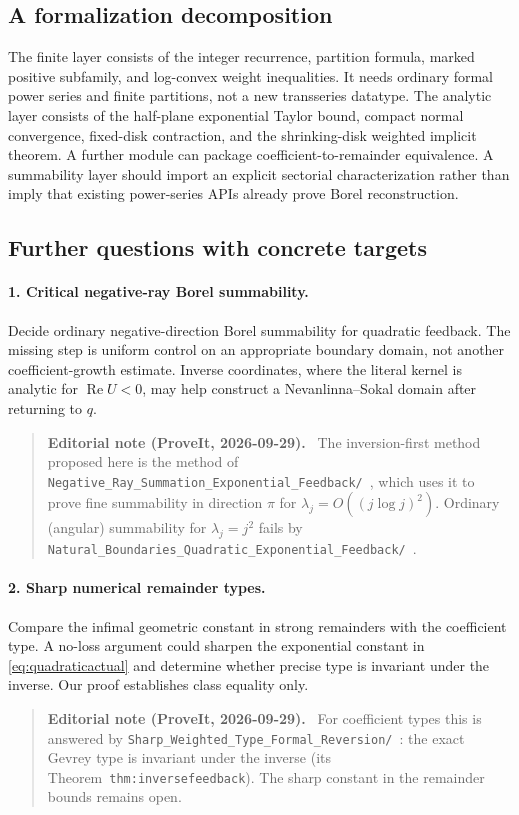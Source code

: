 \documentclass[11pt,a4paper]{article}
\numberwithin{equation}{section}
\theoremstyle{definition}\newtheorem{definition}[theorem]{Definition}
\theoremstyle{remark}\newtheorem{remark}[theorem]{Remark}
\DeclareMathOperator{\Rea}{Re}
\newenvironment{ednote}{\par\smallskip\begin{quote}\small\raggedright\textbf{Editorial note (ProveIt, 2026-09-29).}\ }{\end{quote}\smallskip}
\begin{document}
\subsection{A formalization decomposition}
The finite layer consists of the integer recurrence, partition formula,
marked positive subfamily, and log-convex weight inequalities. It needs
ordinary formal power series and finite partitions, not a new transseries
datatype. The analytic layer consists of the half-plane exponential
Taylor bound, compact normal convergence, fixed-disk contraction, and the
shrinking-disk weighted implicit theorem. A further module can package
coefficient-to-remainder equivalence. A summability layer should import
an explicit sectorial characterization rather than imply that existing
power-series APIs already prove Borel reconstruction.

\subsection{Further questions with concrete targets}
\paragraph{1. Critical negative-ray Borel summability.}
Decide ordinary negative-direction Borel summability for quadratic
feedback. The missing step is uniform control on an appropriate boundary
domain, not another coefficient-growth estimate. Inverse coordinates,
where the literal kernel is analytic for $\Rea U<0$, may help construct
a Nevanlinna--Sokal domain after returning to $q$.
\begin{ednote}
The inversion-first method proposed here is the method of \nolinkurl{Negative_Ray_Summation_Exponential_Feedback/}~\cite{ed:negativeray},
which uses it to prove fine summability in direction $\pi$ for
$\lambda_j=O((j\log j)^2)$. Ordinary (angular) summability for
$\lambda_j=j^2$ fails by \nolinkurl{Natural_Boundaries_Quadratic_Exponential_Feedback/}~\cite{ed:naturalboundaries}.
\end{ednote}

\paragraph{2. Sharp numerical remainder types.}
Compare the infimal geometric constant in strong remainders with the
coefficient type. A no-loss argument could sharpen the exponential
constant in \eqref{eq:quadraticactual} and determine whether precise type
is invariant under the inverse. Our proof establishes class equality only.
\begin{ednote}
For coefficient types this is answered by
\nolinkurl{Sharp_Weighted_Type_Formal_Reversion/}~\cite{ed:weightedtype}:
the exact Gevrey type is invariant under the inverse (its
Theorem~\texttt{thm:inversefeedback}). The sharp constant in the remainder bounds
remains open.
\end{ednote}
\end{document}
